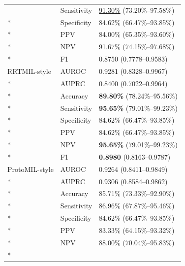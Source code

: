 \begin{longtable}{@{}p{}p{}p{}@{}}
 & Sensitivity & \underline{91.30\%} (73.20\%--97.58\%) \\*

 & Specificity & 84.62\% (66.47\%--93.85\%) \\*

 & PPV & 84.00\% (65.35\%--93.60\%) \\*

 & NPV & 91.67\% (74.15\%--97.68\%) \\*

 & F1 & 0.8750 (0.7778--0.9583) \\

\addlinespace

RRTMIL-style & AUROC & 0.9281 (0.8328--0.9967) \\*

 & AUPRC & 0.8400 (0.7022--0.9964) \\*

 & Accuracy & \textbf{89.80\%} (78.24\%--95.56\%) \\*

 & Sensitivity & \textbf{95.65\%} (79.01\%--99.23\%) \\*

 & Specificity & 84.62\% (66.47\%--93.85\%) \\*

 & PPV & 84.62\% (66.47\%--93.85\%) \\*

 & NPV & \textbf{95.65\%} (79.01\%--99.23\%) \\*

 & F1 & \textbf{0.8980} (0.8163--0.9787) \\

\addlinespace

ProtoMIL-style & AUROC & 0.9264 (0.8411--0.9849) \\*

 & AUPRC & 0.9306 (0.8584--0.9862) \\*

 & Accuracy & 85.71\% (73.33\%--92.90\%) \\*

 & Sensitivity & 86.96\% (67.87\%--95.46\%) \\*

 & Specificity & 84.62\% (66.47\%--93.85\%) \\*

 & PPV & 83.33\% (64.15\%--93.32\%) \\*

 & NPV & 88.00\% (70.04\%--95.83\%) \\*


\end{longtable}
